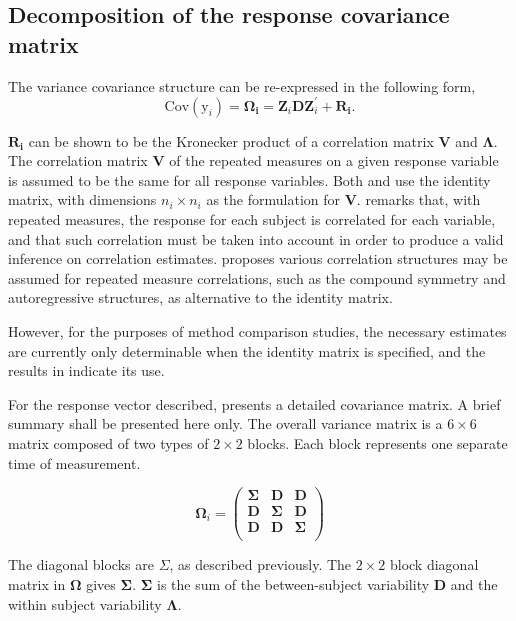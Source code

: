 \documentclass[12pt, a4paper]{article}
\theoremstyle{plain}
\theoremstyle{definition}
\theoremstyle{remark}
\begin{document}
\subsection{Decomposition of the response covariance matrix}

The variance covariance structure can be re-expressed in the following form,
\[
\mbox{Cov}(\mbox{y}_{i}) = \boldsymbol{\Omega_{i}} = \boldsymbol{Z}_{i}\boldsymbol{D}\boldsymbol{Z}_{i}^\prime + \boldsymbol{R_{i}}.
\]

$\boldsymbol{R_{i}}$ can be shown to be the Kronecker product of a correlation matrix $\boldsymbol{V}$ and $\boldsymbol{\Lambda}$. The correlation matrix $\boldsymbol{V}$ of the repeated measures on a given response variable is assumed to be the same for all response variables. Both \citet{hamlett} and \citet{lam} use the identity matrix, with dimensions $n_{i} \times n_{i}$ as the formulation for $\boldsymbol{V}$. \citet{roy} remarks that, with repeated measures, the response for each subject is correlated for each variable, and that such correlation must be taken into account in order to produce a valid inference on correlation estimates.  \citet{roy2006} proposes various correlation structures may be assumed for repeated measure correlations, such as the compound symmetry and autoregressive structures, as alternative to the identity matrix.

However, for the purposes of method comparison studies, the necessary estimates are currently only determinable when the identity matrix is specified, and the results in \citet{roy} indicate its use.

For the response vector described, \citet{hamlett} presents a detailed covariance matrix. A brief summary shall be presented here only. The overall variance matrix is a $6 \times 6$ matrix composed of two types of $2 \times 2$ blocks. Each block represents one separate time of measurement.

\[
\boldsymbol{\Omega}_{i} = \left(
\begin{array}{ccc}
  \boldsymbol{\Sigma} & \boldsymbol{D} & \boldsymbol{D}\\
  \boldsymbol{D} & \boldsymbol{\Sigma} & \boldsymbol{D}\\
  \boldsymbol{D} & \boldsymbol{D} & \boldsymbol{\Sigma}\\
\end{array}\right)
\]

The diagonal blocks are $\Sigma$, as described previously. The $2 \times 2$ block diagonal matrix in $\boldsymbol{\Omega}$ gives $\boldsymbol{\Sigma}$. $\boldsymbol{\Sigma}$ is the sum of the between-subject variability $\boldsymbol{D}$ and the within subject variability $\boldsymbol{\Lambda}$.
\end{document}
